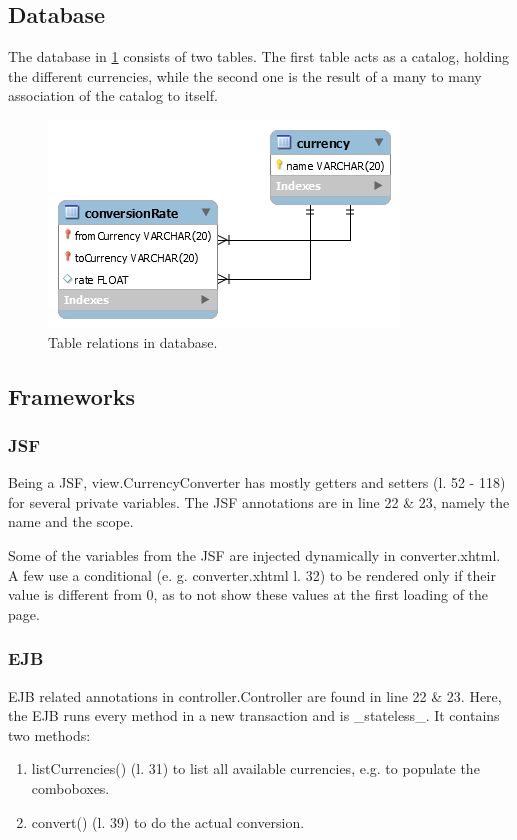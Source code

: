 \documentclass[a4paper]{scrartcl}
\begin{document}
\subsection{Database}
The database in \ref{fig:database} consists of two tables.
The first table acts as a catalog, holding the different currencies, while the second one is the result of a many to many association of the catalog to itself.

\begin{figure}[h!]
  \begin{center}
    \includegraphics[scale=0.8]{db.png}
    \caption{Table relations in database.}
    \label{fig:database}
  \end{center}
\end{figure}



\subsection{Frameworks}

\subsubsection{JSF}
Being a JSF, view.CurrencyConverter has mostly getters and setters (l. 52 - 118) for several private variables.
The JSF annotations are in line 22 \& 23, namely the name and the scope.


Some of the variables from the JSF are injected dynamically in converter.xhtml. A few use a conditional (e. g. converter.xhtml l. 32) to be rendered only if their value is different from 0, as to not show these values at the first loading of the page.




\subsubsection{EJB}
EJB related annotations in controller.Controller are found in line 22 \& 23.
Here, the EJB runs every method in a new transaction and is _stateless_.
It contains two methods:
\begin{enumerate}
	\item listCurrencies() (l. 31) to list all available currencies, e.g. to populate the comboboxes.
	\item convert() (l. 39) to do the actual conversion.
\end{enumerate}
\end{document}
